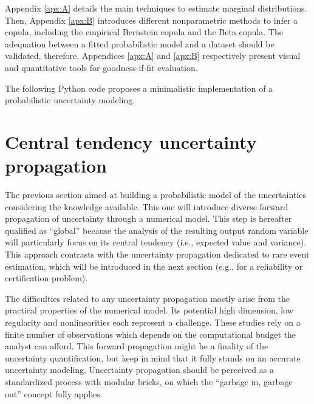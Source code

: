 Appendix \ref{apx:A} details the main techniques to estimate marginal distributions. 
Then, Appendix \ref{apx:B} introduces different nonparametric methods to infer a copula, including the empirical Bernstein copula and the Beta copula. 
The adequation between a fitted probabilistic model and a dataset should be validated, therefore, Appendices \ref{apx:A} and \ref{apx:B} respectively present visual and quantitative tools for goodness-if-fit evaluation.


\begin{otexample}
    The following Python code proposes a minimalistic \ot implementation of a probabilistic uncertainty modeling. 
    \lstset{style=mystyle, language=python}
\end{otexample}


\section{Central tendency uncertainty propagation}

The previous section aimed at building a probabilistic model of the uncertainties considering the knowledge available.
This one will introduce diverse forward propagation of uncertainty through a numerical model. 
This step is hereafter qualified as ``global'' because the analysis of the resulting output random variable will particularly focus on its central tendency (i.e., expected value and variance).
This approach contrasts with the uncertainty propagation dedicated to rare event estimation, which will be introduced in the next section (e.g., for a reliability or certification problem).

The difficulties related to any uncertainty propagation mostly arise from the practical properties of the numerical model. 
Its potential high dimension, low regularity and nonlinearities each represent a challenge. 
These studies rely on a finite number of observations which depends on the computational budget the analyst can afford.   
This forward propagation might be a finality of the uncertainty quantification, but keep in mind that it fully stands on an accurate uncertainty modeling.
Uncertainty propagation should be perceived as a standardized process with modular bricks, on which the ``garbage in, garbage out'' concept fully applies.

